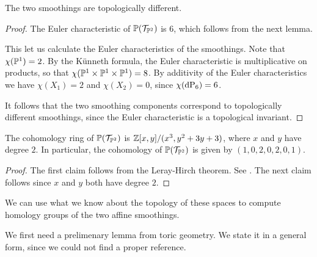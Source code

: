 \begin{proposition}
The two smoothings are topologically different.
\end{proposition}
\begin{proof}
The Euler characteristic of $\P(\mathcal T_{\P^2})$ is $6$, which follows from the next lemma.

This let us calculate the Euler characteristics of the smoothings. Note that $\chi(\P^1)=2$. By the Künneth formula, the Euler characteristic is multiplicative on products, so that $\chi(\P^1 \times \P^1 \times \P^1)=8$. By additivity of the Euler characteristics we have $\chi(X_1)=2$ and $\chi(X_2)=0$, since $\chi(\dP6)=6$.

It follows that the two smoothing components correspond to topologically different smoothings, since the Euler characteristic is a topological invariant.
\end{proof}

\begin{lemma}
The cohomology ring of $\P(\mathcal T_{\P^2})$ is $\Z[x,y]/(x^3,y^2+3y+3)$, where $x$ and $y$ have degree $2$. In particular, the cohomology of $\P(\mathcal T_{\P^2})$ is given by $(1,0,2,0,2,0,1)$.
\end{lemma}
\begin{proof}
The first claim follows from the Leray-Hirch theorem. See \cite[page 270]{bott_tu}. The next claim follows since $x$ and $y$ both have degree $2$.
\end{proof}

We can use what we know about the topology of these spaces to compute homology groups of the two affine smoothings.

We first need a prelimenary lemma from toric geometry. We state it in a general form, since we could not find a proper reference.

